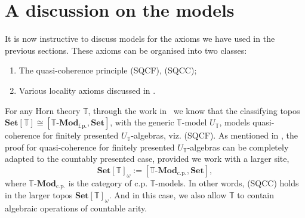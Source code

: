 \documentclass[12pt]{amsart}
\makeatletter
\newtheorem{proposition}[theorem]{Proposition}
\theoremstyle{definition}
\newtheorem{example}[theorem]{Example}
\newtheorem{remark}[theorem]{Remark}
\newcommand{\mb}[1]{\mathbf{#1}}
\newcommand{\mbb}[1]{\mathbb{#1}}
\newcommand{\T}{\mbb T}
\newcommand{\I}{\mbb I}
\newcommand{\mr}[1]{\mathrm{#1}}
\newcommand{\Set}{\mb{Set}}
\newcommand{\fp}{_{\mr{f.p.}}}
\newcommand{\cp}{_{\mr{c.p.}}}
\newcommand{\N}{\mb N}
\newcommand{\fa}[2]{\forall #1\!\colon\!\!#2.\ }
\newcommand{\ex}[2]{\exists #1\!\colon\!\!#2.\ }
\newcommand{\mmod}[1]{#1\text{-}\mathbf{Mod}}
\newcommand{\ct@}[2]{%
  \vtop{\m@th\ialign{##\cr
    \hfil$#1\operator@font lim$\hfil\cr
    \noalign{\nointerlineskip\kern1.5\ex@}#2\cr
    \noalign{\nointerlineskip\kern-\ex@}\cr}}%
}
\newcommand{\ct}{%
  \mathop{\mathpalette\ct@{\rightarrowfill@\textstyle}}\nmlimits@
}
\makeatother
\begin{document}




\section{A discussion on the models}\label{sec:model}

It is now instructive to discuss models for the axioms we have used in the previous sections. These axioms can be organised into two classes:

\begin{enumerate}
  \item The quasi-coherence principle (SQCF), (SQCC);
  \item Various locality axioms discussed in .
\end{enumerate}

For any Horn theory $\T$, through the work in~\cite{blechschmidt2020general,blechschmidt2021using} we know that the classifying topos $\Set[\T] \cong [\mmod\T\fp,\Set]$, with the generic $\T$-model $U_\T$, models quasi-coherence for finitely presented $U_\T$-algebras, viz. (SQCF). As mentioned in , the proof for quasi-coherence for finitely presented $U_\T$-algebras can be completely adapted to the countably presented case, provided we work with a larger site,
\[ \Set[\T]_\omega := [\mmod\T\cp,\Set], \]
where $\mmod\T\cp$ is the category of c.p. $\T$-models. In other words, (SQCC) holds in the larger topos $\Set[\T]_\omega$. And in this case, we also allow $\T$ to contain algebraic operations of countable arity.
\end{document}
